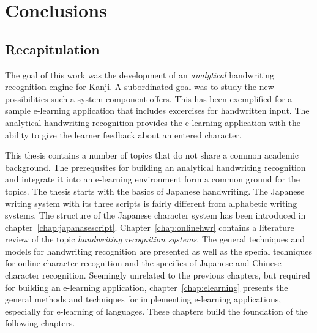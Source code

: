 \chapter{Conclusions}
\label{chap:conclusions}





\section{Recapitulation}
\label{sec:conclusion:recapitulation}

The goal of this work was the development of an \emph{analytical} handwriting
recognition engine for Kanji. A subordinated goal was to study the new 
possibilities such a system component offers. This has been exemplified for
a sample e-learning application that includes excercises for handwritten input.
The analytical handwriting recognition provides the e-learning 
application with the ability to give the learner feedback about an 
entered character.

This thesis contains a number of topics that do not share a common academic 
background. The prerequsites for building an analytical handwriting recognition
and integrate it into an e-learning environment form a common ground for the 
topics. The thesis starts with the basics of Japanese handwriting. The Japanese
writing system with its three scripts is fairly different from alphabetic 
writing systems. The structure of the Japanese character system has been 
introduced in chapter~\ref{chap:japanasescript}.
Chapter~\ref{chap:onlinehwr} contains a literature review of the topic 
\emph{handwriting recognition systems}. The general techniques and models
for handwriting recognition are presented as well as the special techniques
for online character recognition and the specifics of Japanese and Chinese 
character recognition.
Seemingly unrelated to the previous chapters, but required for building an
e-learning application, chapter~\ref{chap:elearning} presents the general
methods and techniques for implementing e-learning applications, especially 
for e-learning of languages. These chapters build the foundation of the
following chapters.

